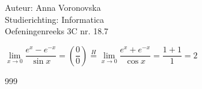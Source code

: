 \documentclass[a4paper]{article}
\begin{document}
  
\noindent \large Auteur: Anna Voronovska \\
\noindent \large Studierichting: Informatica\\
\noindent \large Oefeningenreeks 3C nr. 18.7\\

\medskip

\normalsize

$\lim\limits_{x\to 0} \dfrac{e^x - e^{-x}}{\sin x} = \left(\dfrac{0}{0}\right) \stackrel{H}{=} \lim\limits_{x\to 0} \dfrac{e^x + e^{-x}}{\cos x} = \dfrac{1+1}{1} = 2$

\begin{thebibliography}{999}
\end{thebibliography}
\end{document}
